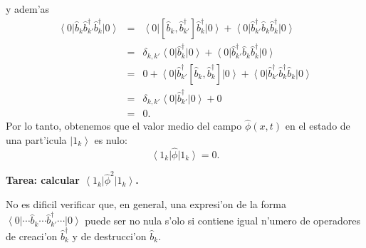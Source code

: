 y adem'as
\begin{eqnarray}
 \left<0\right|\hat{b}_k\hat{b}_{k'}^\dagger \hat{b}_k^\dagger\left|0\right>&=&
\left<0\right|\left[\hat{b}_k,\hat{b}_{k'}^\dagger\right]
\hat{b}_k^\dagger\left|0\right>+\left<0\right|\hat{b}_{k'}^\dagger\hat{b}_k
\hat{b}_k^\dagger\left|0\right> \\
&=&\delta_{k,k'}\left<0\right|\hat{b}_k^\dagger\left|0\right>
+\left<0\right|\hat{b}_{k'}^\dagger\hat{b}_k
\hat{b}_k^\dagger\left|0\right> \\
&=&0+\left<0\right|\hat{b}_{k'}^\dagger\left[\hat{b}_k,
\hat{b}_k^\dagger\right]\left|0\right>+\left<0\right|\hat{b}_{k'}^\dagger\hat{b}
_k^\dagger\hat{b}_k\left|0\right> \\
&=&\delta_{k,k'}\left<0\right|\hat{b}_{k'}^\dagger\left|0\right>+0 \\
&=&0.
\end{eqnarray}
Por lo tanto, obtenemos que el valor medio del campo $\hat{\phi}(x,t)$ en el
estado de una part'icula $\left| 1_k\right>$ es nulo:
\begin{equation}
 \left< 1_k\right| \hat{\phi}\left| 1_k\right>=0.
\end{equation}
\begin{center}
\textbf{Tarea: calcular $\left< 1_k\right| \hat{\phi}^2\left| 1_k\right> $.}
\end{center}

No es dificil verificar que, en general, una expresi'on de la forma
$\left<0\right|\cdots\hat{b}_{k}\cdots\hat{b}_{k'}^\dagger\cdots\left|0\right>$
puede ser no nula s'olo si contiene igual n'umero de operadores de creaci'on
$\hat{b}_{k}^\dagger$ y de destrucci'on $\hat{b}_{k}$.

